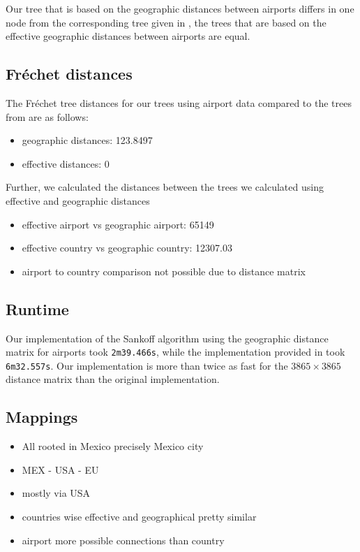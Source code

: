 \documentclass{article}
\begin{document}
Our tree that is based on the geographic distances between airports differs in
one node from the corresponding tree given in
\cite{reimeringPhylogeographicReconstructionUsing2020}, the trees that are based
on the effective geographic distances between airports are equal.

\subsection{Fr\'{e}chet distances}
The Fr\'{e}chet tree distances for our trees using airport data compared to the trees from \cite{reimeringPhylogeographicReconstructionUsing2020} are as follows:
\begin{itemize}
    \item geographic distances: 123.8497
    \item effective distances: 0
\end{itemize}

Further, we calculated the distances between the trees we calculated using effective and geographic distances
\begin{itemize}
    \item effective airport vs geographic airport: 65149
    \item effective country vs geographic country: 12307.03
    \item airport to country comparison not possible due to distance matrix
\end{itemize}

\subsection{Runtime}
Our implementation of the Sankoff algorithm using the geographic distance
matrix for airports took \texttt{2m39.466s}, while the implementation provided in
\cite{reimeringPhylogeographicReconstructionUsing2020} took \texttt{6m32.557s}.
Our implementation is more than twice as fast for the $3865 \times 3865$
distance matrix than the original implementation.

\subsection{Mappings}

\begin{itemize}
    \item All rooted in Mexico precisely Mexico city
    \item MEX - USA - EU
    \item mostly via USA
    \item countries wise effective and geographical pretty similar
    \item airport more possible connections than country
\end{itemize}
\end{document}
